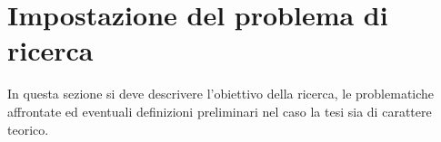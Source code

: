 \chapter{Impostazione del problema di ricerca}
\label{capitolo3}

In questa sezione si deve descrivere l'obiettivo della ricerca, le problematiche affrontate ed eventuali definizioni preliminari nel caso la tesi sia di carattere teorico.